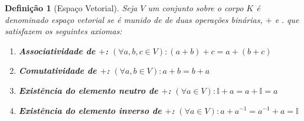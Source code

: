 \documentclass[
    12pt, %
    a4paper, %
]{book}
\newtheorem{defi}{Definição}[section]
\newcommand{\Set}[1]{\mathbb{#1}}
\begin{document}
            \begin{defi}[Espaço Vetorial]\label{defi:espaco-vetorial}
                Seja $V$ um conjunto sobre o corpo $K$ é denominado espaço vetorial se é munido de de duas operações binárias, $+$ e $.$ que satisfazem os seguintes axiomas:

                \begin{enumerate}
                    \item \textbf{Associatividade de $+$:} $(\forall a,b,c \in V): (a+b)+c=a+(b+c)$

                    \item \textbf{Comutatividade de $+$:} $(\forall a,b \in V): a+b=b+a$

                    \item \textbf{Existência do elemento neutro de $+$:} $(\forall a \in V): \Set{I}+a=a+\Set{I}=a$

                    \item \textbf{Existência do elemento inverso de $+$:} $(\forall a \in V): a+a^{-1}=a^{-1}+a=\Set{I}$


                \end{enumerate}
            \end{defi}

    
\end{document}

